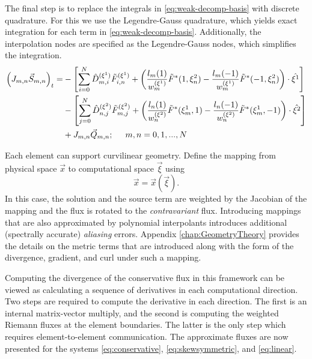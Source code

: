 \documentclass{softwaremanual}
\begin{document}
The final step is to replace the integrals in \eqref{eq:weak-decomp-basis} with discrete quadrature. For this we use the Legendre-Gauss quadrature, which yields exact integration for each term in \eqref{eq:weak-decomp-basis}. Additionally, the interpolation nodes are specified as the Legendre-Gauss nodes, which simplifies the integration.
 \begin{equation}
 \begin{split}
 \left( J_{m,n} \vec{S}_{m,n} \right)_t =  &-\left[\sum_{i=0}^{N}\hat{D}^{(\xi^1)}_{m,i} \tilde{F}^{(\xi^1)}_{i,n}   + \left( \frac{ l_m(1)}{w^{(\xi^1)}_m} \tilde{F}^{*}(1,\xi^2_n) - \frac{ l_m(-1)}{w^{(\xi^1)}_m} \tilde{F}^{*}(-1,\xi^2_n) \right) \cdot \hat{\xi^1} \right] \\
  &-\left[ \sum_{j=0}^{N}\hat{D}^{(\xi^2)}_{n,j} \tilde{F}^{(\xi^2)}_{m,j}  + \left( \frac{l_n(1)}{w^{(\xi^2)}_n} \tilde{F}^{*}(\xi^1_m,1)  -  \frac{l_n(-1)}{w^{(\xi^2)}_n} \tilde{F}^{*}(\xi^1_m,-1) \right)\cdot \hat{\xi^2}  \right] \\ 
 &+ J_{m,n}\vec{Q}_{m,n}; \hspace{5mm} m,n=0,1,...,N
\end{split} \label{eq:discrete2d_system} 
 \end{equation}

Each element can support curvilinear geometry. Define the mapping from physical space $\vec{x}$ to computational space $\vec{\xi}$ using
  \begin{equation}
  \vec{x} = \vec{x}(\vec{\xi}).\label{eq:mapping}
  \end{equation}
In this case, the solution and the source term are weighted by the Jacobian of the mapping and the flux is rotated to the \textit{contravariant} flux. Introducing mappings that are also approximated by polynomial interpolants introduces additional (spectrally accurate) \textit{aliasing} errors.   Appendix \ref{chap:GeometryTheory} provides the details on the metric terms that are introduced along with the form of the divergence, gradient, and curl under such a mapping.

 Computing the divergence of the conservative flux in this framework can be viewed as calculating a sequence of derivatives in each computational direction. Two steps are required to compute the derivative in each direction. The first is an internal matrix-vector multiply, and the second is computing the weighted Riemann fluxes at the element boundaries. The latter is the only step which requires element-to-element communication. The approximate fluxes are now presented for the systems \eqref{eq:conservative}, \eqref{eq:skewsymmetric}, and \eqref{eq:linear}.
\end{document}
